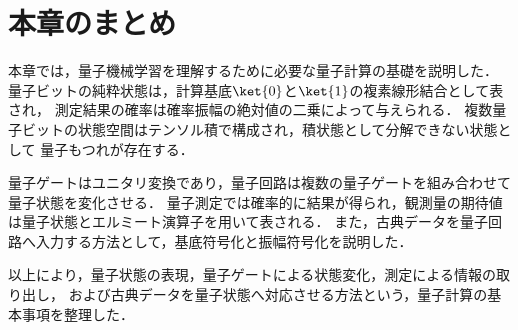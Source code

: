 \section{本章のまとめ}
\label{sec:quantum-basics-summary}

本章では，量子機械学習を理解するために必要な量子計算の基礎を説明した．
量子ビットの純粋状態は，計算基底$\ket{0}$と$\ket{1}$の複素線形結合として表され，
測定結果の確率は確率振幅の絶対値の二乗によって与えられる．
複数量子ビットの状態空間はテンソル積で構成され，積状態として分解できない状態として
量子もつれが存在する．

量子ゲートはユニタリ変換であり，量子回路は複数の量子ゲートを組み合わせて量子状態を変化させる．
量子測定では確率的に結果が得られ，観測量の期待値は量子状態とエルミート演算子を用いて表される．
また，古典データを量子回路へ入力する方法として，基底符号化と振幅符号化を説明した．

以上により，量子状態の表現，量子ゲートによる状態変化，測定による情報の取り出し，
および古典データを量子状態へ対応させる方法という，量子計算の基本事項を整理した．
